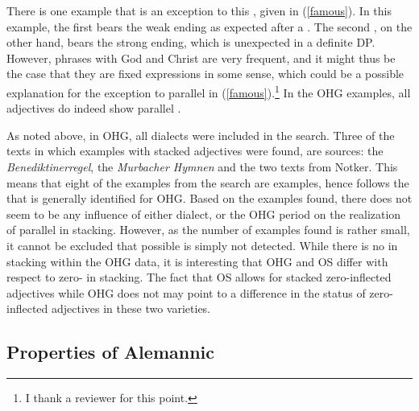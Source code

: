\documentclass[output=paper,colorlinks,citecolor=brown]{langscibook}
\begin{document}
There is one  example that is an exception to this , given in (\ref{famous}). In this example, the first  bears the weak ending as expected after a . The second , on the other hand, bears the strong ending, which is unexpected in a definite DP. However, phrases with God and Christ are very frequent, and it might thus be the case that they are fixed expressions in some sense, which could be a possible explanation for the exception to parallel  in (\ref{famous}).\footnote{I thank a reviewer for this point.} In the OHG examples, all adjectives do indeed show parallel .

\z

As noted above, in OHG, all dialects were included in the search. Three of the texts in which examples with stacked adjectives were found, are  sources: the \textit{Benediktinerregel}, the \textit{Murbacher Hymnen} and the two texts from Notker. This means that eight of the examples from the search are  examples, hence  follows the  that is generally identified for OHG. Based on the examples found, there does not seem to be any influence of either dialect,  or the OHG period on the realization of parallel  in stacking. However, as the number of examples found is rather small, it cannot be excluded that possible  is simply not detected. While there is no  in stacking within the OHG data, it is interesting that OHG and OS differ with respect to zero- in stacking. The fact that OS allows for stacked zero-inflected adjectives while OHG does not may point to a difference in the status of zero-inflected adjectives in these two varieties.

\subsection{Properties of Alemannic}\label{subsect:alm-props}
\end{document}
